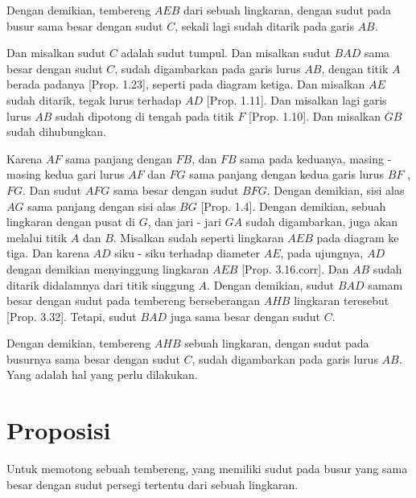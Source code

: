 \documentclass[a4paper]{book}
\begin{document}
Dengan demikian, tembereng $AEB$ dari sebuah lingkaran, dengan sudut pada busur sama
besar dengan sudut $C$, sekali lagi sudah ditarik pada garis $AB$.

Dan misalkan sudut $C$ adalah sudut tumpul. Dan misalkan sudut $BAD$ sama besar 
dengan sudut $C$, sudah digambarkan pada garis lurus $AB$, dengan titik $A$ berada
padanya [Prop. 1.23], seperti pada diagram ketiga. Dan misalkan $AE$ sudah ditarik,
tegak lurus terhadap $AD$ [Prop. 1.11]. Dan misalkan lagi garis lurus $AB$ sudah
dipotong di tengah pada titik $F$ [Prop. 1.10]. Dan misalkan $GB$ sudah dihubungkan.

Karena $AF$ sama panjang dengan $FB$, dan $FB$ sama pada keduanya, masing - masing kedua 
gari lurus $AF$ dan $FG$ sama panjang dengan kedua garis lurus $BF$ , $FG$. Dan 
sudut $AFG$ sama besar dengan sudut $BFG$. Dengan demikian, sisi alas $AG$ sama
panjang dengan sisi alas $BG$ [Prop. 1.4]. Dengan demikian, sebuah lingkaran
dengan pusat di $G$, dan jari - jari $GA$ sudah digambarkan, juga akan melalui titik
$A$ dan $B$. Misalkan sudah seperti lingkaran $AEB$ pada diagram ke tiga. Dan karena
$AD$ siku - siku terhadap diameter $AE$, pada ujungnya, $AD$ dengan demikian 
menyinggung lingkaran $AEB$ [Prop. 3.16.corr]. Dan $AB$ sudah ditarik didalamnya
dari titik singgung $A$. Dengan demikian, sudut $BAD$ samam besar dengan sudut 
pada tembereng berseberangan $AHB$ lingkaran teresebut [Prop. 3.32]. Tetapi,
sudut $BAD$ juga sama besar dengan sudut $C$.

Dengan demikian, tembereng $AHB$ sebuah lingkaran, dengan sudut pada busurnya sama
besar dengan sudut $C$, sudah digambarkan pada garis lurus $AB$. Yang adalah
hal yang perlu dilakukan.

\section*{\centering Proposisi \thesection}
Untuk memotong sebuah tembereng, yang memiliki sudut pada busur yang sama besar
dengan sudut persegi tertentu dari sebuah lingkaran.

\begin{center}
\end{center}
\end{document}

